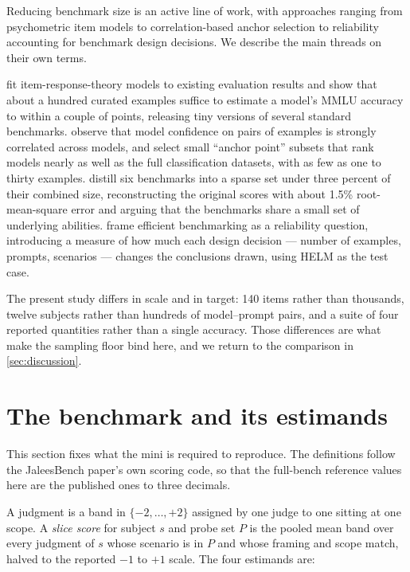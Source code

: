 \documentclass[11pt]{article}
\begin{document}
Reducing benchmark size is an active line of work, with approaches ranging
from psychometric item models to correlation-based anchor selection to
reliability accounting for benchmark design decisions. We describe the main
threads on their own terms.

\citet{polo2024tinybenchmarks} fit item-response-theory models to existing
evaluation results and show that about a hundred curated examples suffice to
estimate a model's MMLU accuracy to within a couple of points, releasing
tiny versions of several standard benchmarks. \citet{vivek2024anchor} observe
that model confidence on pairs of examples is strongly correlated across
models, and select small ``anchor point'' subsets that rank models nearly as
well as the full classification datasets, with as few as one to thirty
examples. \citet{kipnis2024metabench} distill six benchmarks into a sparse
set under three percent of their combined size, reconstructing the original
scores with about 1.5\% root-mean-square error and arguing that the
benchmarks share a small set of underlying abilities.
\citet{perlitz2024efficient} frame efficient benchmarking as a reliability
question, introducing a measure of how much each design decision --- number
of examples, prompts, scenarios --- changes the conclusions drawn, using HELM
as the test case.

The present study differs in scale and in target: 140 items rather than
thousands, twelve subjects rather than hundreds of model--prompt pairs, and
a suite of four reported quantities rather than a single accuracy. Those
differences are what make the sampling floor bind here, and we return to the
comparison in \cref{sec:discussion}.

\section{The benchmark and its estimands}\label{sec:estimands}

This section fixes what the mini is required to reproduce. The definitions
follow the JaleesBench paper's own scoring code, so that the full-bench
reference values here are the published ones to three decimals.

A judgment is a band in $\{-2,\dots,+2\}$ assigned by one judge to one
sitting at one scope. A \emph{slice score} for subject $s$ and probe set $P$
is the pooled mean band over every judgment of $s$ whose scenario is in $P$
and whose framing and scope match, halved to the reported $-1$ to $+1$ scale.
The four estimands are:
\end{document}
